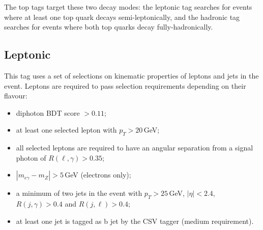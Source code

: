 The top tags target these two decay modes: the leptonic tag searches for \ttH events where at least one top quark decays semi-leptonically, and the hadronic tag searches for \ttH events where both top quarks decay fully-hadronically. 

\subsection{\ttH Leptonic}
This tag uses a set of selections on kinematic properties of leptons and jets in the event. 
Leptons are required to pass selection requirements depending on their flavour:
\begin{itemize}[noitemsep]
    \item diphoton BDT score $> 0.11$;
    \item at least one selected lepton with $p_{T} > 20$\,GeV;
    \item all selected leptons are required to have an angular separation from a signal photon of $R(\ell,\gamma) > 0.35$;
    \item $|m_{e\gamma} - m_{Z}| > 5$\,GeV (electrons only);
    \item a minimum of two jets in the event with $p_{T} > 25$\,GeV, $|\eta| < 2.4$, $R(j,\gamma) > 0.4$ and $R(j,\ell) > 0.4$;
    \item at least one jet is tagged as b jet by the CSV tagger (medium requirement).
\end{itemize}


